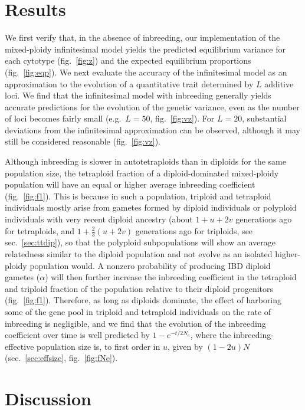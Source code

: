 \hypertarget{results}{%
\section{Results}\label{results}}

We first verify that, in the absence of inbreeding, our implementation
of the mixed-ploidy infinitesimal model yields the predicted equilibrium
variance for each cytotype (fig.~\ref{fig:z}) and the expected
equilibrium proportions (fig.~\ref{fig:eqp}). We next evaluate the
accuracy of the infinitesimal model as an approximation to the evolution
of a quantitative trait determined by \(L\) additive loci. We find that
the infinitesimal model with inbreeding generally yields accurate
predictions for the evolution of the genetic variance, even as the
number of loci becomes fairly small (e.g.~\(L=50\), fig.~\ref{fig:vz}).
For \(L=20\), substantial deviations from the infinitesimal
approximation can be observed, although it may still be considered
reasonable (fig.~\ref{fig:vz}).

Although inbreeding is slower in autotetraploids than in diploids for
the same population size, the tetraploid fraction of a diploid-dominated
mixed-ploidy population will have an equal or higher average inbreeding
coefficient (fig.~\ref{fig:f1}). This is because in such a population,
triploid and tetraploid individuals mostly arise from gametes formed by
diploid individuals or polyploid individuals with very recent diploid
ancestry (about \(1+u+2v\) generations ago for tetraploids, and
\(1+\frac{2}{3}(u+2v)\) generations ago for triploids, see
sec.~\ref{sec:ttdip}), so that the polyploid subpopulations will show an
average relatedness similar to the diploid population and not evolve as
an isolated higher-ploidy population would. A nonzero probability of
producing IBD diploid gametes (\(\alpha\)) will then further increase
the inbreeding coefficient in the tetraploid and triploid fraction of
the population relative to their diploid progenitors
(fig.~\ref{fig:f1}). Therefore, as long as diploids dominate, the effect
of harboring some of the gene pool in triploid and tetraploid
individuals on the rate of inbreeding is negligible, and we find that
the evolution of the inbreeding coefficient over time is well predicted
by \(1-e^{-t/2N_e}\), where the inbreeding-effective population size is,
to first order in \(u\), given by \((1-2u)N\) (sec.~\ref{sec:effsize},
fig.~\ref{fig:fNe}).

\hypertarget{discussion}{%
\section{Discussion}\label{discussion}}

